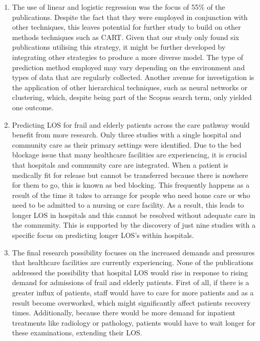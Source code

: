 \documentclass[../thesis.tex]{subfiles}
\begin{document}
\begin{enumerate}
    \item The use of linear and logistic regression was the focus of 55\% of the publications.  Despite the fact that they were employed in conjunction with other techniques, this leaves potential for further study to build on other methods techniques such as CART. Given that our study only found six publications utilising this strategy, it might be further developed by integrating other strategies to produce a more diverse model. The type of prediction method employed may vary depending on the environment and types of data that are regularly collected. Another avenue for investigation is the application of other hierarchical techniques, such as neural networks or clustering, which, despite being part of the Scopus search term, only yielded one outcome.

    \item Predicting LOS for frail and elderly patients across the care pathway would benefit from more research. Only three studies with a single hospital and community care as their primary settings were identified. Due to the bed blockage issue that many healthcare facilities are experiencing, it is crucial that hospitals and community care are integrated. When a patient is medically fit for release but cannot be transferred because there is nowhere for them to go, this is known as bed blocking. This frequently happens as a result of the time it takes to arrange for people who need home care or who need to be admitted to a nursing or care facility. As a result, this leads to longer LOS in hospitals and this cannot be resolved without adequate care in the community. This is supported by the discovery of just nine studies with a specific focus on predicting longer LOS's within hospitals. 

    \item The final research possibility focuses on the increased demands and pressures that healthcare facilities are currently experiencing. None of the publications addressed the possibility that hospital LOS would rise in response to rising demand for admissions of frail and elderly patients. First of all, if there is a greater influx of patients, staff would have to care for more patients and as a result become overworked, which might significantly affect patients recovery times. Additionally, because there would be more demand for inpatient treatments like radiology or pathology, patients would have to wait longer for these examinations, extending their LOS.
    
\end{enumerate}
\end{document}

